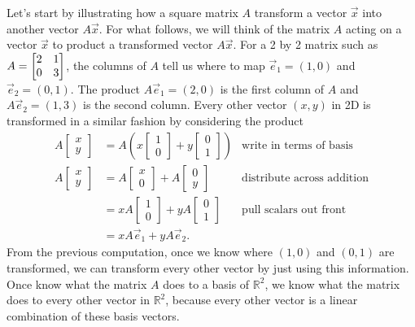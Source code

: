 Let's start by illustrating how a square matrix $A$ transform a vector $\vec x$ into another vector $A\vec x$. 
For what follows, we will think of the matrix $A$ acting on a vector $\vec x$ to product a transformed vector $A\vec x$.
For a 2 by 2 matrix such as $A = \begin{bmatrix}\begin{matrix} 2\\0 \end{matrix}&\begin{matrix} 1\\3 \end{matrix}\end{bmatrix}$, the columns of $A$ tell us where to map $\vec e_1 = (1,0)$ and $\vec e_2=(0,1)$.
The product $A\vec e_1 = (2,0)$ is the first column of $A$ and $A \vec e_2 = (1,3)$ is the second column. 
Every other vector $(x,y)$ in 2D is transformed in a similar fashion by considering the product 
\begin{align*}
A\begin{bmatrix}x\\y\end{bmatrix} 
&=A\left(x\begin{bmatrix}1\\0\end{bmatrix}+ 
y\begin{bmatrix}0\\1\end{bmatrix}\right) &\text{write in terms of basis}\\
A\begin{bmatrix}x\\y\end{bmatrix} 
&=A\begin{bmatrix}x\\0\end{bmatrix}+ 
A\begin{bmatrix}0\\y\end{bmatrix} &\text{distribute across addition}\\
&=xA\begin{bmatrix}1\\0\end{bmatrix}+ 
yA\begin{bmatrix}0\\1\end{bmatrix} &\text{pull scalars out front}\\
&=xA\vec e_1+yA\vec e_2.
\end{align*}
From the previous computation, once we know where $(1,0)$ and $(0,1)$ are transformed, we can transform every other vector by just using this information. Once know what the matrix $A$ does to a basis of $\mathbb{R}^2$, we know what the matrix does to every other vector in $\mathbb{R}^2$, because every other vector is a linear combination of these basis vectors.



